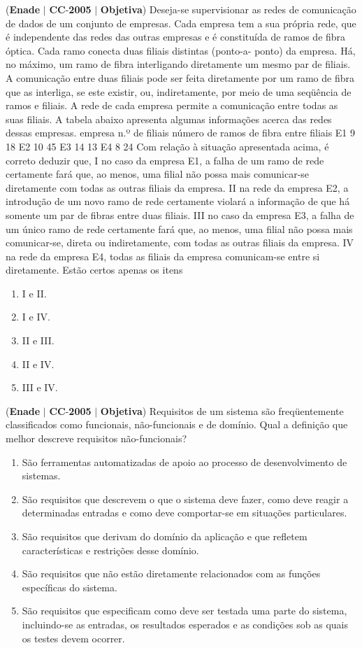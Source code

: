 \documentclass{exam}
\begin{document}
\begin{questions}
\question (\textbf{Enade} $|$ \textbf{CC}-\textbf{2005} $|$ \textbf{Objetiva})
Deseja-se supervisionar as redes de comunicação
de dados de um conjunto de empresas. Cada empresa
tem a sua própria rede, que é independente das redes
das outras empresas e é constituída de ramos de fibra
óptica. Cada ramo conecta duas filiais distintas (ponto-a-
ponto) da empresa. Há, no máximo, um ramo de fibra
interligando diretamente um mesmo par de filiais.
A comunicação entre duas filiais pode ser feita
diretamente por um ramo de fibra que as interliga, se
este existir, ou, indiretamente, por meio de uma
seqüência de ramos e filiais. A rede de cada empresa
permite a comunicação entre todas as suas filiais.
A tabela abaixo apresenta algumas informações acerca
das redes dessas empresas.
empresa n.º de filiais
número de ramos
de fibra entre filiais
E1 9 18
E2 10 45
E3 14 13
E4 8 24
Com relação à situação apresentada acima, é correto deduzir
que,
I no caso da empresa E1, a falha de um ramo de rede
certamente fará que, ao menos, uma filial não possa mais
comunicar-se diretamente com todas as outras filiais da
empresa.
II na rede da empresa E2, a introdução de um novo ramo de
rede certamente violará a informação de que há somente
um par de fibras entre duas filiais.
III no caso da empresa E3, a falha de um único ramo de rede
certamente fará que, ao menos, uma filial não possa mais
comunicar-se, direta ou indiretamente, com todas as outras
filiais da empresa.
IV na rede da empresa E4, todas as filiais da empresa
comunicam-se entre si diretamente.
Estão certos apenas os itens
	\begin{enumerate}[label=\alph*)]
		\item  I e II. 
		\item  I e IV. 
		\item  II e III.
		\item  II e IV.
		\item  III e IV.
	\end{enumerate}

\question (\textbf{Enade} $|$ \textbf{CC}-\textbf{2005} $|$ \textbf{Objetiva})
Requisitos de um sistema são freqüentemente classificados como
funcionais, não-funcionais e de domínio. Qual a definição que
melhor descreve requisitos não-funcionais?
	\begin{enumerate}[label=\alph*)]
		\item  São ferramentas automatizadas de apoio ao processo de
desenvolvimento de sistemas.
		\item  São requisitos que descrevem o que o sistema deve fazer, como
deve reagir a determinadas entradas e como deve comportar-se
em situações particulares.
		\item  São requisitos que derivam do domínio da aplicação e que
refletem características e restrições desse domínio.
		\item  São requisitos que não estão diretamente relacionados com as
funções específicas do sistema.
		\item  São requisitos que especificam como deve ser testada uma parte
do sistema, incluindo-se as entradas, os resultados esperados e as
condições sob as quais os testes devem ocorrer.
	\end{enumerate}


\end{questions}
\end{document}
